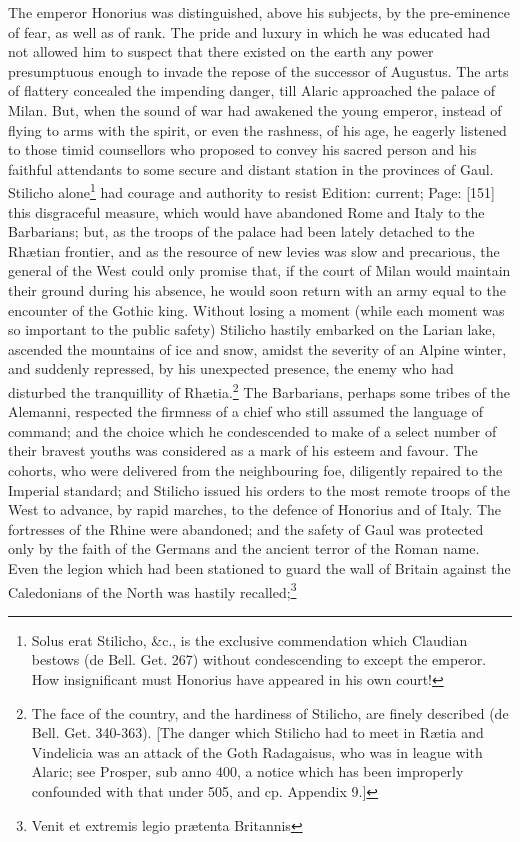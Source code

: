 The emperor Honorius was distinguished, above his subjects, by the pre-eminence of fear, as well as of rank. The pride and luxury in which he was educated had not allowed him to suspect that there existed on the earth any power presumptuous enough to invade the repose of the successor of Augustus. The arts of flattery concealed the impending danger, till Alaric approached the palace of Milan. But, when the sound of war had awakened the young emperor, instead of flying to arms with the spirit, or even the rashness, of his age, he eagerly listened to those timid counsellors who proposed to convey his sacred person and his faithful attendants to some secure and distant station in the provinces of Gaul. Stilicho alone\footnote{Solus erat Stilicho, \&c., is the exclusive commendation which Claudian bestows (de Bell. Get. 267) without condescending to except the emperor. How insignificant must Honorius have appeared in his own court!} had courage and authority to resist Edition: current; Page: [151] this disgraceful measure, which would have abandoned Rome and Italy to the Barbarians; but, as the troops of the palace had been lately detached to the Rhætian frontier, and as the resource of new levies was slow and precarious, the general of the West could only promise that, if the court of Milan would maintain their ground during his absence, he would soon return with an army equal to the encounter of the Gothic king. Without losing a moment (while each moment was so important to the public safety) Stilicho hastily embarked on the Larian lake, ascended the mountains of ice and snow, amidst the severity of an Alpine winter, and suddenly repressed, by his unexpected presence, the enemy who had disturbed the tranquillity of Rhætia.\footnote{The face of the country, and the hardiness of Stilicho, are finely described (de Bell. Get. 340-363). [The danger which Stilicho had to meet in Rætia and Vindelicia was an attack of the Goth Radagaisus, who was in league with Alaric; see Prosper, sub anno 400, a notice which has been improperly confounded with that under 505, and cp. Appendix 9.]} The Barbarians, perhaps some tribes of the Alemanni, respected the firmness of a chief who still assumed the language of command; and the choice which he condescended to make of a select number of their bravest youths was considered as a mark of his esteem and favour. The cohorts, who were delivered from the neighbouring foe, diligently repaired to the Imperial standard; and Stilicho issued his orders to the most remote troops of the West to advance, by rapid marches, to the defence of Honorius and of Italy. The fortresses of the Rhine were abandoned; and the safety of Gaul was protected only by the faith of the Germans and the ancient terror of the Roman name. Even the legion which had been stationed to guard the wall of Britain against the Caledonians of the North was hastily recalled;\footnote{Venit et extremis legio prætenta Britannis

}
